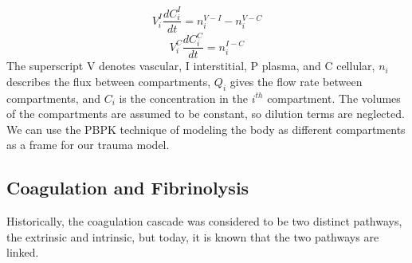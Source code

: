 \documentclass[12pt]{article}
\begin{document}
\begin{equation}
V^I_i\frac{dC^I_i}{dt} =n_i^{V-I}-n_i^{V-C}
\end{equation}
\begin{equation}
V^C_i\frac{dC^C_i}{dt} =n_i^{I-C}
\end{equation}
The superscript V denotes vascular, I interstitial, P plasma, and C cellular, $n_i$ describes the flux between compartments, $Q_i$ gives the flow rate between compartments, and $C_i$ is the concentration in the $i^{th}$ compartment. \citep{clewell2007physiologically} The volumes of the compartments are assumed to be constant, so dilution terms are neglected. We can use the PBPK technique of modeling the body as different compartments as a frame for our trauma model.
\subsection*{Coagulation and Fibrinolysis}
Historically, the coagulation cascade was considered to be two distinct pathways, the extrinsic and intrinsic, but today, it is known that the two pathways are linked.\cite{adams2009review} 
\end{document}
